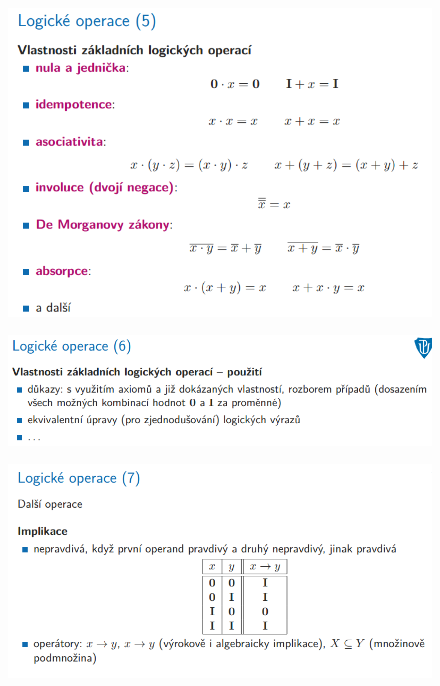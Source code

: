 \documentclass[10pt,a4paper]{article}
\begin{document}
\begin{figure} [h]
	\includegraphics[scale=0.65]{img/prvni_odstavec/otazka2/logicke_operace6.png}	
\end{figure}

\begin{figure} [h]
	\includegraphics[scale=0.65]{img/prvni_odstavec/otazka2/logicke_operace7.png}	
\end{figure}

\begin{figure} [h]
	\includegraphics[scale=0.65]{img/prvni_odstavec/otazka2/logicke_operace8.png}	
\end{figure}
\end{document}
